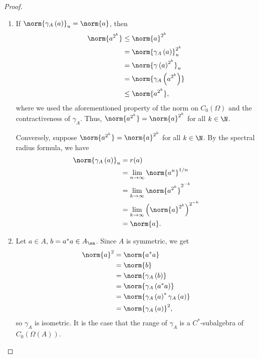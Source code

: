 \documentclass[10pt]{mypackage}
\begin{document}
\begin{proof}\hfill
  \begin{enumerate}[(1)]
    \item If $\norm{\gamma_A\left(a\right)}_u = \norm{a}$, then
      \begin{align*}
        \norm{a^{2^k}} &\leq \norm{a}^{2^k}\\
                       &= \norm{\gamma_A\left(a\right)}_u^{2^k}\\
                       &= \norm{\gamma\left(a\right)^{2^k}}_{u}\\
                       &= \norm{\gamma_A\left(a^{2^k}\right)}\\
                       &\leq \norm{a^{2^k}},
      \end{align*}
      where we used the aforementioned property of the norm on $C_0\left(\Omega\right)$ and the contractiveness of $\gamma_A$. Thus, $\norm{a^{2^k}} = \norm{a}^{2^k}$ for all $k\in \N$.\newline

      Conversely, suppose $\norm{a^{2^k}} = \norm{a}^{2^k}$ for all $k\in \N$. By the spectral radius formula, we have
      \begin{align*}
        \norm{\gamma_A\left(a\right)}_u &= r(a)\\
                                        &= \lim_{n\rightarrow\infty}\norm{a^n}^{1/n}\\
                                        &= \lim_{k\rightarrow\infty}\norm{a^{2^k}}^{2^{-k}}\\
                                        &= \lim_{k\rightarrow\infty}\left(\norm{a}^{2^k}\right)^{2^{-k}}\\
                                        &= \norm{a}.
      \end{align*}
    \item Let $a\in A$, $b = a^{\ast}a\in A_{\sa}$. Since $A$ is symmetric, we get
      \begin{align*}
        \norm{a}^2 &= \norm{a^{\ast}a}\\
                   &= \norm{b}\\
                   &= \norm{\gamma_A\left(b\right)}\\
                   &= \norm{\gamma_A\left(a^{\ast}a\right)}\\
                   &= \norm{\gamma_A\left(a\right)^{\ast}\gamma_A\left(a\right)}\\
                   &= \norm{\gamma_A\left(a\right)}^2,
      \end{align*}
      so $\gamma_A$ is isometric. It is the case that the range of $\gamma_A$ is a $C^{\ast}$-subalgebra of $C_0\left(\Omega\left(A\right)\right)$.
  \end{enumerate}
\end{proof}
\end{document}

